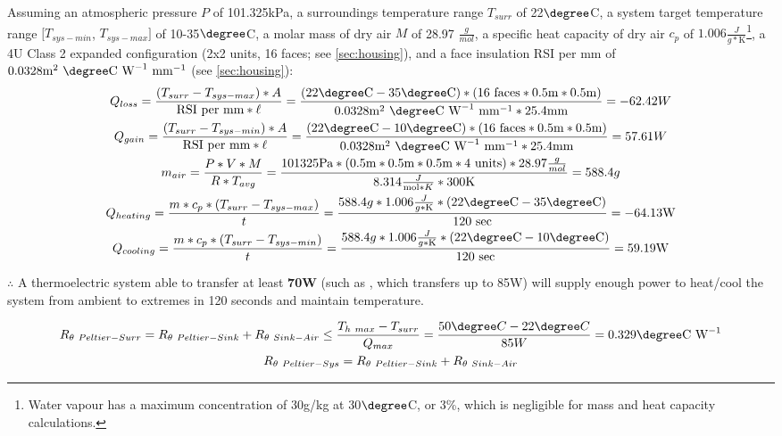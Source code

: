 Assuming an atmospheric pressure $P$ of 101.325kPa, a surroundings temperature range $T_{surr}$ of 22$\degree$C, a system target temperature range $[T_{sys-min}$, $T_{sys-max}]$ of 10-35$\degree$C, a molar mass of dry air $M$ of 28.97 $\frac g{mol}$, a specific heat capacity of dry air $c_p$ of $1.006 \frac{J}{g*\text{K}}$\footnote{Water vapour has a maximum concentration of 30g/kg at 30$\degree$C, or 3\%, which is negligible for mass and heat capacity calculations.}, a 4U Class 2 expanded configuration (2x2 units, 16 faces; see \ref{sec:housing}), and a face insulation RSI per mm of $0.0328\text{m}^2~  \degree \text{C}~\text{W}^{-1}~\text{mm}^{-1}$ (see \ref{sec:housing}):\\
\vspace{.05cm}
\begin{gather}
    \label{eqn:heatloss}
    Q_{loss}=\frac{(T_{surr}-T_{sys-max}) * A}{\text{RSI per mm} * \ell}=\frac{(22\degree \text{C}-35\degree \text{C}) * (16 \text{ faces} * 0.5\text{m} * 0.5\text{m})}{0.0328 \text{m}^2~  \degree \text{C}~\text{W}^{-1}~\text{mm}^{-1} * 25.4 \text{mm}}=-62.42 W\\
    \label{eqn:heatgain}
    Q_{gain}=\frac{(T_{surr}-T_{sys-min}) * A}{\text{RSI per mm} * \ell}=\frac{(22\degree \text{C}-10\degree \text{C}) * (16 \text{ faces} * 0.5\text{m} * 0.5\text{m})}{0.0328 \text{m}^2~  \degree \text{C}~\text{W}^{-1}~\text{mm}^{-1} * 25.4 \text{mm}}=57.61 W\\
    \label{eqn:airmass}
    m_{air}=\frac{P*V*M}{R*T_{avg}}=\frac{101325\text{Pa}*(0.5\text{m}*0.5\text{m}*0.5\text{m}*4\text{ units})*28.97\frac g{mol}}{8.314\frac{J}{\text{mol}*K}*300\text{K}}=588.4g\\
    \label{eqn:heating}
    Q_{heating}=\frac{m*c_p*(T_{surr}-T_{sys-max})}{t}=\frac{588.4g*1.006\frac{J}{g*\text{K}}*(22\degree \text{C}-35\degree \text{C})}{120\text{ sec}}=-64.13\text{W}\\
    \label{eqn:cooling}
    Q_{cooling}=\frac{m*c_p*(T_{surr}-T_{sys-min})}{t}=\frac{588.4g*1.006\frac{J}{g*\text{K}}*(22\degree \text{C}-10\degree \text{C})}{120\text{ sec}}=59.19\text{W}
\end{gather}

\clearpage

$\therefore$ A thermoelectric system able to transfer at least \textbf{70W} (such as \cite{peltier}, which transfers up to 85W) will supply enough power to heat/cool the system from ambient to extremes in 120 seconds and maintain temperature.

\begin{gather}
    \label{eqn:thermalresistance-hot}
    R_{\theta~Peltier-Surr}=R_{\theta~Peltier-Sink}+R_{\theta~Sink-Air}\le\frac{T_{h~max} - T_{surr}}{Q_{max}}=\frac{50\degree C - 22\degree C}{85W}=0.329\degree \text{C W}^{-1}\\
    \label{eqn:thermalresistance-cold}
    R_{\theta~Peltier-Sys}=R_{\theta~Peltier-Sink}+R_{\theta~Sink-Air}
\end{gather}

